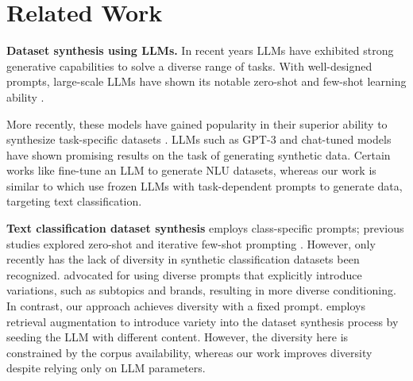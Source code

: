 \section{Related Work}
\textbf{Dataset synthesis using LLMs.} In recent years LLMs have exhibited strong generative capabilities \cite{NEURIPS2020_1457c0d6, Cobbe2021TrainingVT} to solve a diverse range of tasks. With well-designed prompts, large-scale LLMs have shown its notable zero-shot and few-shot learning ability \cite{shin-etal-2020-autoprompt, jiang-etal-2020-know, 10.1145/3411763.3451760}. 

More recently, these models have gained popularity in their superior ability to synthesize task-specific datasets \cite{Wang2021TowardsZL, Lee2021NeuralDA, kumar-etal-2020-data, puri-etal-2020-training, AnabyTavor2019DoNH}. LLMs such as GPT-3 \cite{wang-etal-2023-self-instruct, honovich-etal-2023-unnatural, west-etal-2022-symbolic} and chat-tuned models \cite{Yehudai2024GenieAH, yu2023large, wang-etal-2023-lets} have shown promising results on the task of generating synthetic data. Certain works like \citet{Meng2023TuningLM} fine-tune an LLM to generate NLU datasets, whereas our work is similar to \citet{schick-schutze-2021-generating,Meng2022GeneratingTD} which use frozen LLMs with task-dependent prompts to generate data, targeting text classification.

\textbf{Text classification dataset synthesis} employs class-specific prompts; previous studies explored zero-shot \cite{Ye2022ZeroGenEZ} and iterative few-shot prompting \cite{ye-etal-2022-progen}. However, only recently has the lack of diversity in synthetic classification datasets been recognized. \citet{yu2023large} advocated for using diverse prompts that explicitly introduce variations, such as subtopics and brands, resulting in more diverse conditioning. In contrast, our approach achieves diversity with a fixed prompt. \citet{divekar2024synthesizrr} employs retrieval augmentation to introduce variety into the dataset synthesis process by seeding the LLM with different content. However, the diversity here is constrained by the corpus availability, whereas our work improves diversity despite relying only on LLM parameters.



